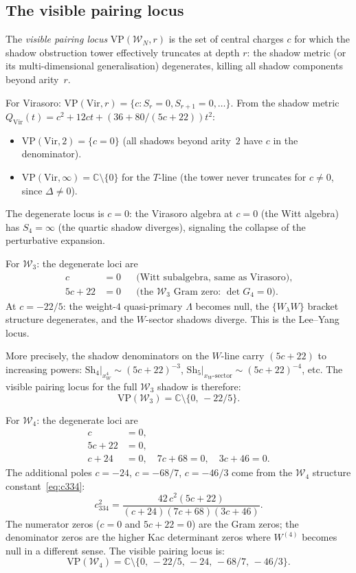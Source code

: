 \documentclass[11pt]{article}
\newcommand{\cW}{\mathcal{W}}
\newcommand{\C}{\mathbb{C}}
\begin{document}
\subsection*{The visible pairing locus}

\begin{definition}
\label{def:visible-pairing}
The \emph{visible pairing locus} $\mathrm{VP}(\cW_N, r)$ is
the set of central charges $c$ for which the shadow obstruction tower
effectively truncates at depth $r$: the shadow metric (or its
multi-dimensional generalisation) degenerates, killing all
shadow components beyond arity~$r$.
\end{definition}

For Virasoro: $\mathrm{VP}(\mathrm{Vir}, r) = \{c : S_r = 0,
S_{r+1} = 0, \ldots\}$.  From the shadow metric
$Q_{\mathrm{Vir}}(t) = c^2 + 12ct + (36 + 80/(5c{+}22))t^2$:
\begin{itemize}[nosep]
\item $\mathrm{VP}(\mathrm{Vir}, 2) = \{c = 0\}$
  (all shadows beyond arity~$2$ have $c$ in the denominator).
\item $\mathrm{VP}(\mathrm{Vir}, \infty) = \C \setminus \{0\}$
  for the $T$-line (the tower never truncates for $c \ne 0$,
  since $\Delta \ne 0$).
\end{itemize}
The degenerate locus is $c = 0$: the Virasoro algebra at $c = 0$
(the Witt algebra) has $S_4 = \infty$ (the quartic shadow
diverges), signaling the collapse of the perturbative expansion.

For $\cW_3$: the degenerate loci are
\begin{align*}
c &= 0 &&\text{(Witt subalgebra, same as Virasoro)}, \\
5c + 22 &= 0 &&\text{(the $\cW_3$ Gram zero: $\det G_4 = 0$)}.
\end{align*}
At $c = -22/5$: the weight-$4$ quasi-primary $\Lambda$ becomes
null, the $\{W_\lambda W\}$ bracket structure degenerates, and
the $W$-sector shadows diverge.  This is the Lee--Yang locus.

More precisely, the shadow denominators on the $W$-line carry
$(5c{+}22)$ to increasing powers:
$\mathrm{Sh}_4|_{x_W^4} \sim (5c{+}22)^{-3}$,
$\mathrm{Sh}_5|_{x_W \text{-sector}} \sim (5c{+}22)^{-4}$,
etc.  The visible pairing locus for the full $\cW_3$ shadow
is therefore:
\[
\mathrm{VP}(\cW_3) = \C \setminus \{0,\, -22/5\}.
\]

For $\cW_4$: the degenerate loci are
\begin{align*}
c &= 0, \\
5c + 22 &= 0, \\
c + 24 &= 0, \quad 7c + 68 = 0, \quad 3c + 46 = 0.
\end{align*}
The additional poles $c = -24$, $c = -68/7$, $c = -46/3$ come
from the $\cW_4$ structure constant~\eqref{eq:c334}:
\[
c_{334}^2
= \frac{42\,c^2(5c+22)}{(c+24)(7c+68)(3c+46)}.
\]
The numerator zeros ($c = 0$ and $5c + 22 = 0$) are the Gram
zeros; the denominator zeros are the higher Kac determinant
zeros where $W^{(4)}$ becomes null in a different sense.
The visible pairing locus is:
\[
\mathrm{VP}(\cW_4)
= \C \setminus \{0,\, -22/5,\, -24,\, -68/7,\, -46/3\}.
\]
\end{document}
